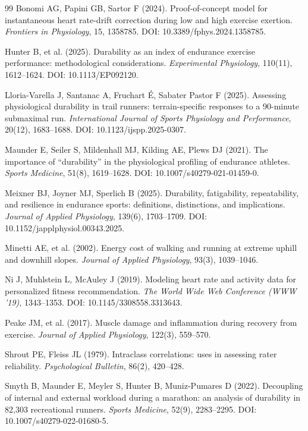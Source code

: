\documentclass[times, twoside]{zHenriquesLab-StyleBioRxiv}
\begin{document}
\begin{thebibliography}{99}
Bonomi AG, Papini GB, Sartor F (2024). Proof-of-concept model for instantaneous heart rate-drift correction during low and high exercise exertion. \textit{Frontiers in Physiology}, 15, 1358785. DOI: 10.3389/fphys.2024.1358785.

Hunter B, et al. (2025). Durability as an index of endurance exercise performance: methodological considerations. \textit{Experimental Physiology}, 110(11), 1612--1624. DOI: 10.1113/EP092120.

Lloria-Varella J, Santanac A, Fruchart {\'E}, Sabater Pastor F (2025). Assessing physiological durability in trail runners: terrain-specific responses to a 90-minute submaximal run. \textit{International Journal of Sports Physiology and Performance}, 20(12), 1683--1688. DOI: 10.1123/ijspp.2025-0307.

Maunder E, Seiler S, Mildenhall MJ, Kilding AE, Plews DJ (2021). The importance of ``durability'' in the physiological profiling of endurance athletes. \textit{Sports Medicine}, 51(8), 1619--1628. DOI: 10.1007/s40279-021-01459-0.

Meixner BJ, Joyner MJ, Sperlich B (2025). Durability, fatigability, repeatability, and resilience in endurance sports: definitions, distinctions, and implications. \textit{Journal of Applied Physiology}, 139(6), 1703--1709. DOI: 10.1152/japplphysiol.00343.2025.

Minetti AE, et al. (2002). Energy cost of walking and running at extreme uphill and downhill slopes. \textit{Journal of Applied Physiology}, 93(3), 1039--1046.

Ni J, Muhlstein L, McAuley J (2019). Modeling heart rate and activity data for personalized fitness recommendation. \textit{The World Wide Web Conference (WWW '19)}, 1343--1353. DOI: 10.1145/3308558.3313643.

Peake JM, et al. (2017). Muscle damage and inflammation during recovery from exercise. \textit{Journal of Applied Physiology}, 122(3), 559--570.

Shrout PE, Fleiss JL (1979). Intraclass correlations: uses in assessing rater reliability. \textit{Psychological Bulletin}, 86(2), 420--428.

Smyth B, Maunder E, Meyler S, Hunter B, Muniz-Pumares D (2022). Decoupling of internal and external workload during a marathon: an analysis of durability in 82,303 recreational runners. \textit{Sports Medicine}, 52(9), 2283--2295. DOI: 10.1007/s40279-022-01680-5.


\end{thebibliography}
\end{document}
